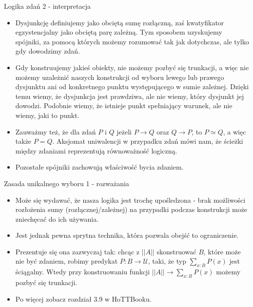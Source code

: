 \documentclass{beamer}
\newcommand{\U}{\mathcal{U}}
\newcommand{\trf}[1]{||#1||}
\begin{document}
\begin{frame}{Logika zdań 2 - interpretacja}
\begin{itemize}
	\item Dysjunkcję definiujemy jako obciętą sumę rozłączną, zaś kwatyfikator egzystencjalny jako obciętą parę zależną. Tym sposobem uzyskujemy spójniki, za pomocą których możemy rozumować tak jak dotychczas, ale tylko gdy dowodzimy zdań.
	\item Gdy konstruujemy jakieś obiekty, nie możemy pozbyć się trunkacji, a więc nie możemy uzależnić naszych konstrukcji od wyboru lewego lub prawego dysjunktu ani od konkretnego punktu występującego w sumie zależnej. Dzięki temu wiemy, że dysjunkcja jest prawdziwa, ale nie wiemy, który dysjunkt jej dowodzi. Podobnie wiemy, że istnieje punkt spełniający warunek, ale nie wiemy, jaki to punkt.
	\item Zauważmy też, że dla zdań $P$ i $Q$ jeżeli $P \to Q$ oraz $Q \to P$, to $P \simeq Q$, a więc także $P = Q$. Aksjomat uniwalencji w przypadku zdań mówi nam, że ścieżki między zdaniami reprezentują równoważność logiczną.
	\item Pozostałe spójniki zachowują właściwość bycia zdaniem.
\end{itemize}
\end{frame}

\begin{frame}{Zasada unikalnego wyboru 1 - rozważania}
\begin{itemize}
	\item Może się wydawać, że nasza logika jest trochę upośledzona - brak możliwości rozłożenia sumy (rozłącznej/zależnej) na przypadki podczas konstrukcji może zniechęcać do ich używania.
	\item Jest jednak pewna sprytna technika, która pozwala obejść to ograniczenie.
	\item Prezentuje się ona zazwyczaj tak: chcąc z $\trf{A}$ skonstruować $B$, które może nie być zdaniem, robimy predykat $P : B \to \U$, taki, że typ $\sum_{x : B} P(x)$ jest ściągalny. Wtedy przy konstruowaniu funkcji $\trf{A} \to \sum_{x : B} P(x)$ możemy pozbyć się trunkacji.
	\item Po więcej zobacz rozdział 3.9 w HoTTBooku.
\end{itemize}
\end{frame}
\end{document}
